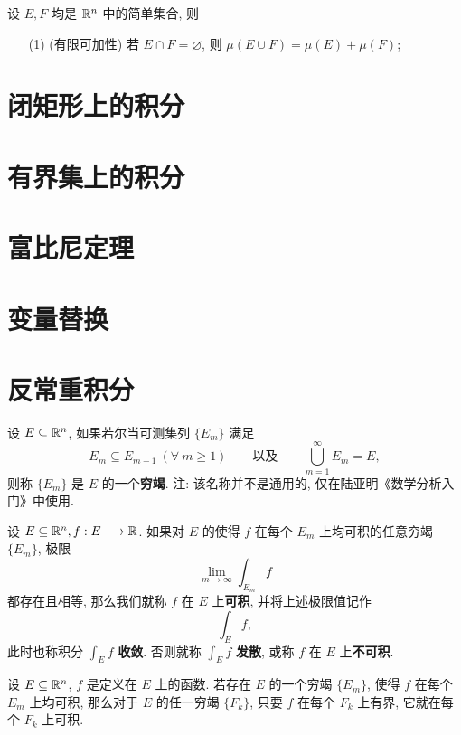 \begin{proposition}
	设 $E,F$ 均是 $\mathbb {R}^{n}$ 中的简单集合, 则
	\begin{itemize}[leftmargin=1.5cm]
		\item[(1)](有限可加性) 若 $E\cap F=\varnothing$, 则 $\mu(E\cup F)=\mu(E)+\mu(F)$;
	\end{itemize}
\end{proposition}

\section{闭矩形上的积分}
\section{有界集上的积分}
\section{富比尼定理}
\section{变量替换}

\section{反常重积分}

\begin{definition}
	设 $E\subseteq \mathbb {R}^{n}$, 如果若尔当可测集列 $\{E_m\}$ 满足 $$E_m\subseteq E_{m+1}\ (\forall\ m \geqslant 1)\qquad \text{以及} \qquad \bigcup\limits_{m=1}^\infty E_m=E,$$ 则称 $\{E_m\}$ 是 $E$ 的一个\textbf{穷竭}.
	注: 该名称并不是通用的, 仅在陆亚明《数学分析入门》中使用.
\end{definition}

\begin{definition}\label{反常重积分定义}
	设 $E\subseteq \mathbb {R}^{n}, f:E\longrightarrow \mathbb R$. 如果对 $E$ 的使得 $f$ 在每个 $E_m$ 上均可积的任意穷竭 $\{E_m\}$, 极限 $$\lim\limits_{m\to\infty} \int_{E_m}f$$ 都存在且相等, 那么我们就称 $f$ 在 $E$ 上\textbf{可积}, 并将上述极限值记作 $$\int_E f,$$
	此时也称积分 $\displaystyle\int_E f$ \textbf{收敛}. 否则就称 $\displaystyle\int_E f$ \textbf{发散}, 或称 $f$ 在 $E$ 上\textbf{不可积}.
\end{definition}

\begin{lemma}
	设 $E\subseteq \mathbb {R}^{n}$, $f$ 是定义在 $E$ 上的函数. 若存在 $E$ 的一个穷竭 $\{E_m\}$, 使得 $f$ 在每个 $E_m$ 上均可积, 那么对于 $E$ 的任一穷竭 $\{F_k\}$, 只要 $f$ 在每个 $F_k$ 上有界, 它就在每个 $F_k$ 上可积.
\end{lemma}

